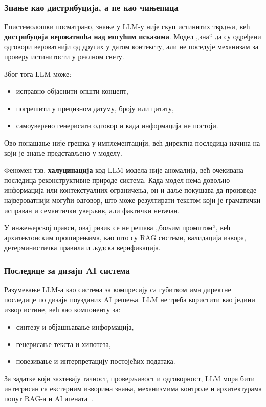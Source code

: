 \subsubsection*{Знање као дистрибуција, а не као чињеница}

Епистемолошки посматрано,
знање у LLM-у није скуп истинитих тврдњи,
већ \textbf{дистрибуција вероватноћа над могућим исказима}.
Модел „зна“ да су одређени одговори вероватнији од других
у датом контексту, али не поседује механизам
за проверу истинитости у реалном свету.

Због тога LLM може:
\begin{itemize}
    \item исправно објаснити општи концепт,
    \item погрешити у прецизном датуму, броју или цитату,
    \item самоуверено генерисати одговор и када информација не постоји.
\end{itemize}

Ово понашање није грешка у имплементацији,
већ директна последица начина на који је знање представљено у моделу.

\begin{tcolorbox}[colback=gray!10!white,colframe=black!75!white,title=Импликација: Феномен халуцинација]
Феномен тзв. \textbf{халуцинација} код LLM модела
није аномалија, већ очекивана последица реконструктивне природе система.
Када модел нема довољно информација или контекстуалних ограничења,
он и даље покушава да произведе највероватнији могући одговор,
што може резултирати текстом који је граматички исправан
и семантички уверљив, али фактички нетачан.

У инжењерској пракси, овај ризик се не решава
„бољим промптом“, већ архитектонским проширењима,
као што су RAG системи, валидација извора,
детерминистичка правила и људска верификација.
\end{tcolorbox}

\subsubsection*{Последице за дизајн AI система}

Разумевање LLM-а као система за компресију са губитком
има директне последице по дизајн поузданих AI решења.
LLM не треба користити као једини извор истине,
већ као компоненту за:
\begin{itemize}
    \item синтезу и објашњавање информација,
    \item генерисање текста и хипотеза,
    \item повезивање и интерпретацију постојећих података.
\end{itemize}
\noindent
За задатке који захтевају тачност, проверљивост и одговорност,
LLM мора бити интегрисан са екстерним изворима знања,
механизмима контроле и архитектурама попут RAG-а и AI агената~\cite{lin2022truthfulqa,liang2022helm}.


